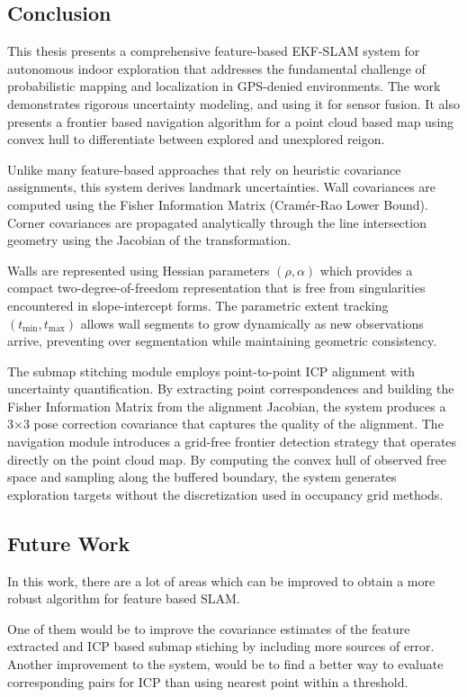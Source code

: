 \documentclass[11pt]{article}
\begin{document}
\subsection{Conclusion}

This thesis presents a comprehensive feature-based EKF-SLAM system for autonomous indoor exploration that addresses the fundamental challenge of probabilistic mapping and localization in GPS-denied environments. The work demonstrates rigorous uncertainty modeling, and using it for sensor fusion. It also presents a frontier based navigation algorithm for a point cloud based map using convex hull to differentiate between explored and unexplored reigon.

Unlike many feature-based approaches that rely on heuristic covariance assignments, this system derives landmark uncertainties. Wall covariances are computed using the Fisher Information Matrix (Cramér-Rao Lower Bound). Corner covariances are propagated analytically through the line intersection geometry using the Jacobian of the transformation. 

Walls are represented using Hessian parameters $(\rho, \alpha)$ which provides a compact two-degree-of-freedom representation that is free from singularities encountered in slope-intercept forms. The parametric extent tracking $(t_{\text{min}}, t_{\text{max}})$ allows wall segments to grow dynamically as new observations arrive, preventing over segmentation while maintaining geometric consistency.

The submap stitching module employs point-to-point ICP alignment with uncertainty quantification. By extracting point correspondences and building the Fisher Information Matrix from the alignment Jacobian, the system produces a 3×3 pose correction covariance that captures the quality of the alignment. The navigation module introduces a grid-free frontier detection strategy that operates directly on the point cloud map. By computing the convex hull of observed free space and sampling along the buffered boundary, the system generates exploration targets without the discretization used in occupancy grid methods.

\subsection{Future Work}

In this work, there are a lot of areas which can be improved to obtain a more robust algorithm for feature based SLAM.

One of them would be to improve the covariance estimates of the feature extracted and ICP based submap stiching by including more sources of error. Another improvement to the system, would be to find a better way to evaluate corresponding pairs for ICP than using nearest point within a threshold.
\end{document}
